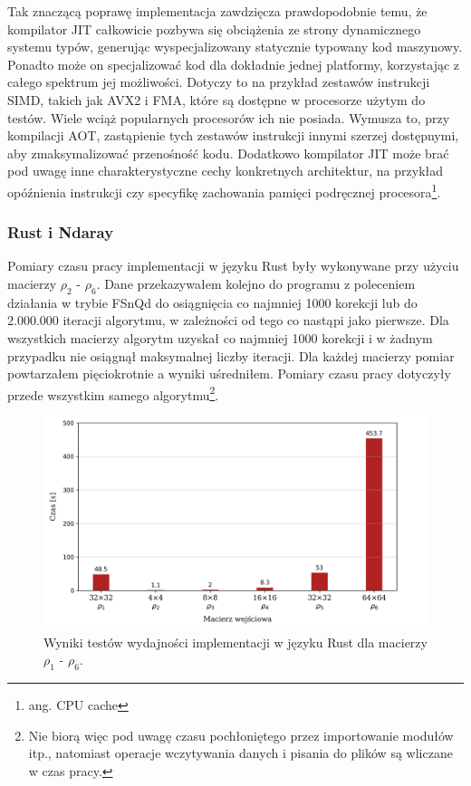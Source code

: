 \documentclass[11pt, a4paper]{article}
\begin{document}
\begin{sloppypar}
    Tak znaczącą poprawę implementacja zawdzięcza prawdopodobnie temu, że kompilator JIT
    całkowicie pozbywa się obciążenia ze strony dynamicznego systemu typów, generując wyspecjalizowany
    statycznie typowany kod maszynowy. Ponadto może on specjalizować kod dla dokładnie
    jednej platformy, korzystając z całego spektrum jej możliwości. Dotyczy to na
    przykład zestawów instrukcji SIMD, takich jak AVX2 i FMA, które są dostępne w
    procesorze użytym do testów. Wiele wciąż popularnych procesorów ich nie posiada.
    Wymusza to, przy kompilacji AOT, zastąpienie tych zestawów instrukcji innymi szerzej
    dostępnymi, aby zmaksymalizować przenośność kodu. Dodatkowo kompilator JIT może brać
    pod uwagę inne charakterystyczne cechy konkretnych architektur, na przykład opóźnienia
    instrukcji czy specyfikę zachowania pamięci podręcznej procesora\footnote{ang. CPU cache}.

    \FloatBarrier

    \subsubsection{ Rust i Ndaray}


    Pomiary czasu pracy implementacji w języku Rust były wykonywane przy użyciu macierzy
    $\rho_{2}$ - $\rho_{6}$. Dane przekazywałem kolejno do programu z poleceniem
    działania w trybie FSnQd do osiągnięcia co najmniej 1000 korekcji lub do 2.000.000 iteracji
    algorytmu, w zależności od tego co nastąpi jako pierwsze. Dla wszystkich macierzy algorytm
    uzyskał co najmniej 1000 korekcji i w żadnym przypadku nie osiągnął maksymalnej liczby
    iteracji. Dla każdej macierzy pomiar powtarzałem pięciokrotnie a wyniki uśredniłem. Pomiary
    czasu pracy dotyczyły przede wszystkim samego algorytmu\footnote{Nie biorą więc pod
    uwagę czasu pochłoniętego przez importowanie modułów itp., natomiast operacje
    wczytywania danych i pisania do plików są wliczane w czas pracy.}.

    \begin{figure}[!ht]
      \centering
      \includegraphics[width=1.0\textwidth]{"resources/rust_performance_tests.png"}
      \caption{Wyniki testów wydajności implementacji w języku Rust dla macierzy $\rho_{1}$ - $\rho
      _{6}$.}
      \label{rust-double-precision}
    \end{figure}


\end{sloppypar}
\end{document}
